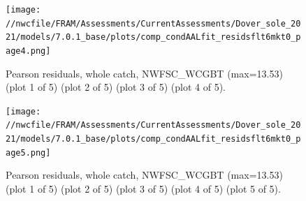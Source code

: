 \documentclass[11pt,
  english,
  a4paper,
]{article}
\begin{document}
\tagmcend\tagstructend


\begin{figure}
\centering
\texttt{[image: //nwcfile/FRAM/Assessments/CurrentAssessments/Dover\_sole\_2021/models/7.0.1\_base/plots/comp\_condAALfit\_residsflt6mkt0\_page4.png]}
\caption{Pearson residuals, whole catch, NWFSC\_WCGBT (max=13.53) (plot 1 of 5) (plot 2 of 5) (plot 3 of 5) (plot 4 of 5).\label{fig:comp_condAALfit_residsflt6mkt0_page4}}
\end{figure}

\tagmcend\tagstructend


\begin{figure}
\centering
\texttt{[image: //nwcfile/FRAM/Assessments/CurrentAssessments/Dover\_sole\_2021/models/7.0.1\_base/plots/comp\_condAALfit\_residsflt6mkt0\_page5.png]}
\caption{Pearson residuals, whole catch, NWFSC\_WCGBT (max=13.53) (plot 1 of 5) (plot 2 of 5) (plot 3 of 5) (plot 4 of 5) (plot 5 of 5).\label{fig:comp_condAALfit_residsflt6mkt0_page5}}
\end{figure}

\tagmcend\tagstructend
\end{document}

